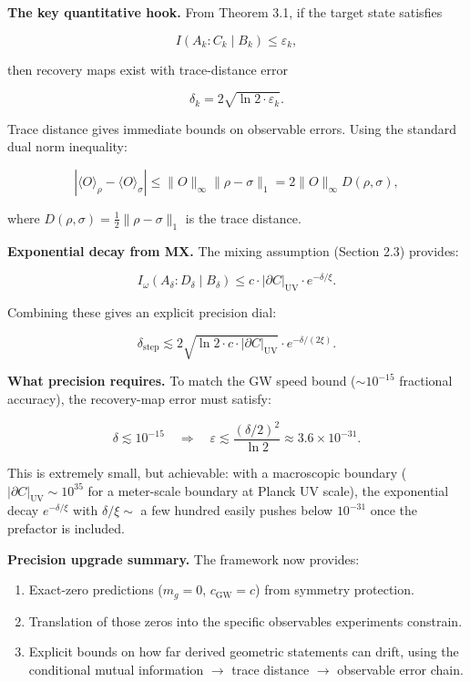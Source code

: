 \documentclass[11pt,a4paper]{article}
\theoremstyle{remark}
\providecommand{\tightlist}{%
  \setlength{\itemsep}{0pt}\setlength{\parskip}{0pt}}
\begin{document}
\textbf{The key quantitative hook.} From Theorem 3.1, if the target state satisfies

\[
I(A_k : C_k \mid B_k) \le \varepsilon_k,
\]

then recovery maps exist with trace-distance error

\[
\delta_k = 2\sqrt{\ln 2 \cdot \varepsilon_k}.
\]

Trace distance gives immediate bounds on observable errors. Using the
standard dual norm inequality:

\[
|\langle O \rangle_\rho - \langle O \rangle_\sigma|
\le \|O\|_\infty \|\rho - \sigma\|_1 = 2 \|O\|_\infty D(\rho, \sigma),
\]

where \(D(\rho, \sigma) = \frac{1}{2}\|\rho - \sigma\|_1\) is the trace distance.

\textbf{Exponential decay from MX.} The mixing assumption (Section 2.3) provides:

\[
I_\omega(A_\delta : D_\delta \mid B_\delta)
\le c \cdot |\partial C|_{\mathrm{UV}} \cdot e^{-\delta/\xi}.
\]

Combining these gives an explicit precision dial:

\[
\delta_{\mathrm{step}} \lesssim 2\sqrt{\ln 2 \cdot c \cdot |\partial C|_{\mathrm{UV}}}
\cdot e^{-\delta/(2\xi)}.
\]

\textbf{What precision requires.} To match the GW speed bound (\(\sim 10^{-15}\)
fractional accuracy), the recovery-map error must satisfy:

\[
\delta \lesssim 10^{-15}
\quad \Rightarrow \quad
\varepsilon \lesssim \frac{(\delta/2)^2}{\ln 2} \approx 3.6 \times 10^{-31}.
\]

This is extremely small, but achievable: with a macroscopic boundary
(\(|\partial C|_{\mathrm{UV}} \sim 10^{35}\) for a meter-scale boundary at Planck UV
scale), the exponential decay \(e^{-\delta/\xi}\) with \(\delta/\xi \sim\) a few
hundred easily pushes below \(10^{-31}\) once the prefactor is included.

\textbf{Precision upgrade summary.} The framework now provides:

\begin{enumerate}
\def\labelenumi{\arabic{enumi}.}
\tightlist
\item
  Exact-zero predictions (\(m_g = 0\), \(c_{\mathrm{GW}} = c\)) from symmetry
  protection.
\item
  Translation of those zeros into the specific observables experiments
  constrain.
\item
  Explicit bounds on how far derived geometric statements can drift, using
  the conditional mutual information \ensuremath{\to} trace distance \ensuremath{\to} observable
  error chain.
\end{enumerate}
\end{document}

